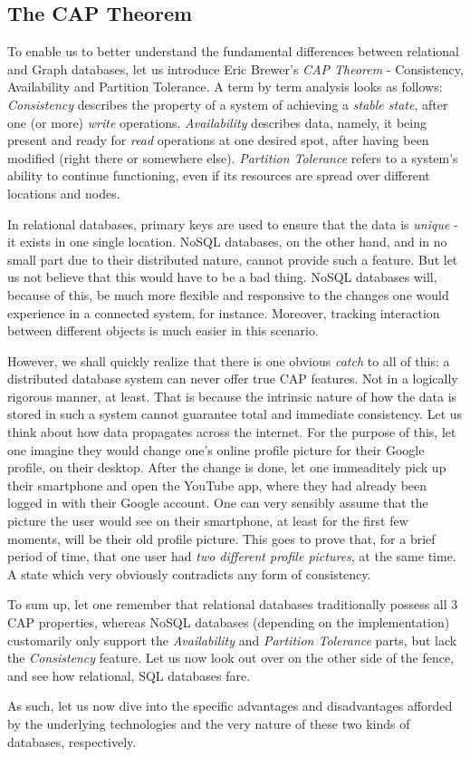 \documentclass[10pt,        %
               a4paper,     %
               journal,     %
               ]{IEEEtran}
\begin{document}
\subsection{The CAP Theorem}
To enable us to better understand the fundamental differences between relational and Graph databases, let us introduce Eric Brewer's \textit{CAP Theorem} - Consistency, Availability and Partition Tolerance. \cite{brewer_cap_theorem} A term by term analysis looks as follows: \textit{Consistency} describes the property of a system of achieving a \textit{stable state}, after one (or more) \textit{write} operations. \textit{Availability} describes data, namely, it being present and ready for \textit{read} operations at one desired spot, after having been modified (right there or somewhere else). \textit{Partition Tolerance} refers to a system's ability to continue functioning, even if its resources are spread over different locations and nodes. \par
In relational databases, primary keys are used to ensure that the data is \textit{unique} - it exists in one single location. NoSQL databases, on the other hand, and in no small part due to their distributed nature, cannot provide such a feature. But let us not believe that this would have to be a bad thing. NoSQL databases will, because of this, be much more flexible and responsive to the changes one would experience in a connected system, for instance. Moreover, tracking interaction between different objects is much easier in this scenario. \par
However, we shall quickly realize that there is one obvious \textit{catch} to all of this: a distributed database system can never offer true CAP features. Not in a logically rigorous manner, at least. That is because the intrinsic nature of how the data is stored in such a system cannot guarantee total and immediate consistency. Let us think about how data propagates across the internet. For the purpose of this, let one imagine they would change one's online profile picture for their Google profile, on their desktop. After the change is done, let one immeaditely pick up their smartphone and open the YouTube app, where they had already been logged in with their Google account. One can very sensibly assume that the picture the user would see on their smartphone, at least for the first few moments, will be their old profile picture. This goes to prove that, for a brief period of time, that one user had \textit{two different profile pictures}, at the same time. A state which very obviously contradicts any form of consistency. \par
To sum up, let one remember that relational databases traditionally possess all 3 CAP properties, whereas NoSQL databases (depending on the implementation) customarily only support the \textit{Availability} and \textit{Partition Tolerance} parts, but lack the \textit{Consistency} feature. Let us now look out over on the other side of the fence, and see how relational, SQL databases fare. \par
As such, let us now dive into the specific advantages and disadvantages afforded by the underlying technologies and the very nature of these two kinds of databases, respectively. 
\end{document}

